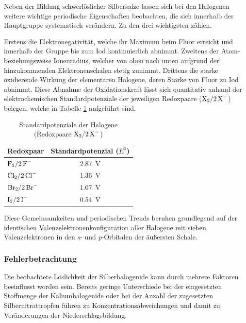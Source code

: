 Neben der Bildung schwerlöslicher Silbersalze lassen sich bei den Halogenen weitere wichtige periodische Eigenschaften beobachten, die sich innerhalb der Hauptgruppe systematisch verändern. Zu den drei wichtigsten zählen.

Erstens die Elektronegativität, welche ihr Maximum beim Fluor erreicht und innerhalb der Gruppe bis zum Iod kontinuierlich abnimmt. Zweitens der Atom- beziehungsweise Ionenradius, welcher von oben nach unten aufgrund der hinzukommenden Elektronenschalen stetig zunimmt. Drittens die starke oxidierende Wirkung der elementaren Halogene, deren Stärke von Fluor zu Iod abnimmt. Diese Abnahme der Oxidationskraft lässt sich quantitativ anhand der elektrochemischen Standardpotenziale der jeweiligen Redoxpaare ($\ce{X2}/\ce{2X-}$) belegen, welche in Tabelle \ref{stdPot} aufgeführt sind.

\begin{table}[htbp]
    \centering
    \caption{Standardpotenziale der Halogene (Redoxpaare $\ce{X2}/\ce{2X-}$) \cite{holleman_wiberg}}
    \begin{tabular}{|l|c|}
        \hline
        Redoxpaar            & Standardpotenzial ($E^0$) \\
        \hline
        $\ce{F2}/\ce{2F-}$   & \SI{+2,87}{\volt}         \\
        \hline
        $\ce{Cl2}/\ce{2Cl-}$ & \SI{+1,36}{\volt}         \\
        \hline
        $\ce{Br2}/\ce{2Br-}$ & \SI{+1,07}{\volt}         \\
        \hline
        $\ce{I2}/\ce{2I-}$   & \SI{+0,54}{\volt}         \\
        \hline
    \end{tabular}
    \label{stdPot}
\end{table}

Diese Gemeinsamkeiten und periodischen Trends beruhen grundlegend auf der identischen Valenzelektronenkonfiguration aller Halogene mit sieben Valenzelektronen in den \textit{s}- und \textit{p}-Orbitalen der äußersten Schale. \cite{skript}

\subsubsection{Fehlerbetrachtung}
Die beobachtete Löslichkeit der Silberhalogenide kann durch mehrere Faktoren beeinflusst worden sein. Bereits geringe Unterschiede bei der eingesetzten Stoffmenge der Kaliumhalogenide oder bei der Anzahl der zugesetzten Silbernitrattropfen führen zu Konzentrationsabweichungen und damit zu Veränderungen der Niederschlagsbildung.

